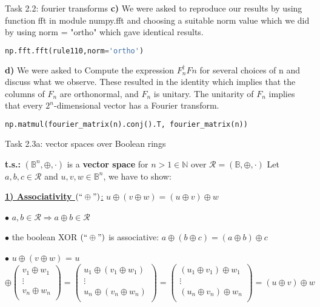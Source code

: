 \documentclass[aspectratio=169]{beamer}
\begin{document}
\begin{frame}[fragile]{Task 2.2: fourier transforms}
\textbf{c)} We were asked to reproduce our results by using function fft in module numpy.fft and choosing a suitable norm value which we did by using norm = "ortho" which gave identical results.

\begin{lstlisting}[language=Python]
np.fft.fft(rule110,norm='ortho')
\end{lstlisting}

\textbf{d)} We were asked to Compute the expression $F_n^{\dagger} Fn$ for several choices of n and discuss what we observe. These resulted in the identity which implies that the columns of $F_n$ are orthonormal, and $F_n$ is unitary. The unitarity of
$F_n$
  implies that every
$2^n$-dimensional vector has a Fourier transform.

\begin{lstlisting}[language=Python]
np.matmul(fourier_matrix(n).conj().T, fourier_matrix(n))
\end{lstlisting}

\end{frame}


\begin{frame}{Task 2.3a: vector spaces over Boolean rings}

\textbf{t.s.:} $(\mathbb{B}^n, \oplus, \cdot )$ is a \textbf{vector space} for $n>1\in \mathbb{N}$ over $\mathcal{R} = (\mathbb{B}, \oplus, \cdot )$\newline
Let $a, b, c \in \mathcal{R}$ and $u, v, w \in \mathbb{B}^n$, we have to show:\newline

\underline{\textbf{1) Associativity $(``\oplus")$}:} $u \oplus (v \oplus w) = (u \oplus v) \oplus w$\newline

$\bullet$ $a, b\in \mathcal{R} \Rightarrow a \oplus b \in \mathcal{R}$\newline

$\bullet$ the boolean XOR $(``\oplus")$ is associative:
$a\oplus (b \oplus c) = (a \oplus b) \oplus c$\newline

$\bullet$ $u \oplus (v \oplus w)$ = $u$ $\oplus
\begin{pmatrix}
v_1 \oplus w_1\\
\vdots\\
v_n \oplus w_n\\
\end{pmatrix} =
\begin{pmatrix}
u_1 \oplus (v_1 \oplus w_1)\\
\vdots\\
u_n \oplus (v_n \oplus w_n)\\
\end{pmatrix} =
\begin{pmatrix}
(u_1 \oplus v_1) \oplus w_1\\
\vdots\\
(u_n \oplus v_n) \oplus w_n\\
\end{pmatrix} = (u \oplus v) \oplus w$
\end{frame}
\end{document}
